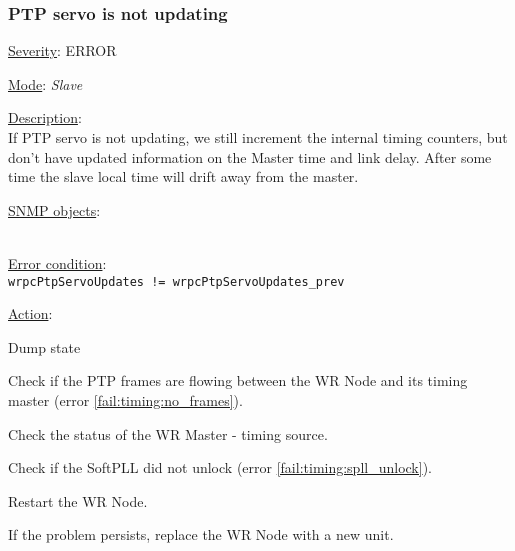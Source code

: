 \subsubsection{\bf PTP servo is not updating}
		\label{fail:timing:servo_not_updating}
		\begin{pck_descr}
			\item [] \underline{Severity}: ERROR
			\item [] \underline{Mode}: \emph{Slave}
			\item [] \underline{Description}:\\
				If PTP servo is not updating, we still increment the internal timing
				counters, but don't have updated information on the Master time and link
				delay. After some time the slave local time will drift away from the
				master.
			\item [] \underline{SNMP objects}:\\
				{\footnotesize
				\\
				 }
			\item [] \underline{Error condition}:\\
				{\footnotesize
				\texttt{wrpcPtpServoUpdates != wrpcPtpServoUpdates\_prev} }
      \item [] \underline{Action}:
        \begin{pck_proc}
        \item Dump state
        \item Check if the PTP frames are flowing between the WR Node and its
          timing master (error \ref{fail:timing:no_frames}).
        \item Check the status of the WR Master - timing source.
        \item Check if the SoftPLL did not unlock (error
          \ref{fail:timing:spll_unlock}).
        \item Restart the WR Node.
        \item If the problem persists, replace the WR Node with a new unit.
        \end{pck_proc}
		\end{pck_descr}

